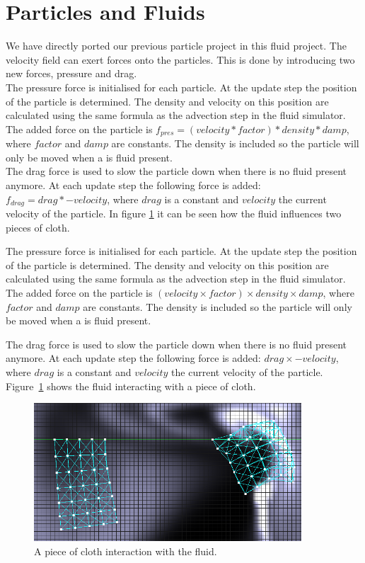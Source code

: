 \section{Particles and Fluids}
We have directly ported our previous particle project in this fluid project. The velocity field can exert forces onto the particles. This is done by introducing two new forces, pressure and drag.\\
The pressure force is initialised for each particle. At the update step the position of the particle is determined. The density and velocity on this position are calculated using the same formula as the advection step in the fluid simulator. The added force on the particle is $ f_{pres} = (velocity*factor) * density * damp$, where $factor$ and $damp$ are constants. The density is included so the particle will only be moved when a is fluid present.\\
The drag force is used to slow the particle down when there is no fluid present anymore. At each update step the following force is added: $f_{drag} = drag * -velocity$, where $drag$ is a constant and $velocity$ the current velocity of the particle. In figure \ref{fig:cloth} it can be seen how the fluid influences two pieces of cloth.

\noindent The pressure force is initialised for each particle.
At the update step the position of the particle is determined.
The density and velocity on this position are calculated using the same formula as the advection step in the fluid simulator.
The added force on the particle is $(velocity \times factor) \times density \times damp$, where $factor$ and $damp$ are constants.
The density is included so the particle will only be moved when a is fluid present.

\noindent The drag force is used to slow the particle down when there is no fluid present anymore.
At each update step the following force is added: $drag \times -velocity$, where $drag$ is a constant and $velocity$ the current velocity of the particle.\\
Figure~\ref{fig:cloth} shows the fluid interacting with a piece of cloth.

\begin{figure}[h]
    \centering
    \includegraphics[width=10cm]{img/cloth.png}
    \caption{A piece of cloth interaction with the fluid.}
    \label{fig:cloth}
\end{figure}
